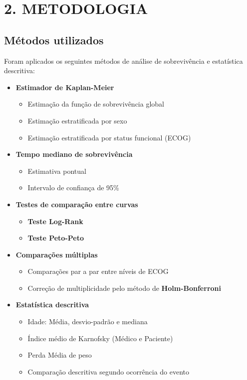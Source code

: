 \documentclass[
  brazilian,
  letterpaper,
  DIV=11,
  numbers=noendperiod]{scrartcl}
\providecommand{\tightlist}{%
  \setlength{\itemsep}{0pt}\setlength{\parskip}{0pt}}
\begin{document}
\section{\texorpdfstring{\textbf{2.
METODOLOGIA}}{2. METODOLOGIA}}\label{metodologia}

\subsection{\texorpdfstring{\textbf{Métodos
utilizados}}{Métodos utilizados}}\label{muxe9todos-utilizados}

Foram aplicados os seguintes métodos de análise de sobrevivência e
estatística descritiva:

\begin{itemize}
\tightlist
\item
  \textbf{Estimador de Kaplan-Meier}

  \begin{itemize}
  \tightlist
  \item
    Estimação da função de sobrevivência global
  \item
    Estimação estratificada por sexo
  \item
    Estimação estratificada por status funcional (ECOG)
  \end{itemize}
\item
  \textbf{Tempo mediano de sobrevivência}

  \begin{itemize}
  \tightlist
  \item
    Estimativa pontual
  \item
    Intervalo de confiança de 95\%
  \end{itemize}
\item
  \textbf{Testes de comparação entre curvas}

  \begin{itemize}
  \tightlist
  \item
    \textbf{Teste Log-Rank}
  \item
    \textbf{Teste Peto-Peto}
  \end{itemize}
\item
  \textbf{Comparações múltiplas}

  \begin{itemize}
  \tightlist
  \item
    Comparações par a par entre níveis de ECOG
  \item
    Correção de multiplicidade pelo método de \textbf{Holm-Bonferroni}
  \end{itemize}
\item
  \textbf{Estatística descritiva}

  \begin{itemize}
  \tightlist
  \item
    Idade: Média, desvio-padrão e mediana
  \item
    Índice médio de Karnofsky (Médico e Paciente)
  \item
    Perda Média de peso
  \item
    Comparação descritiva segundo ocorrência do evento
  \end{itemize}
\end{itemize}
\end{document}
